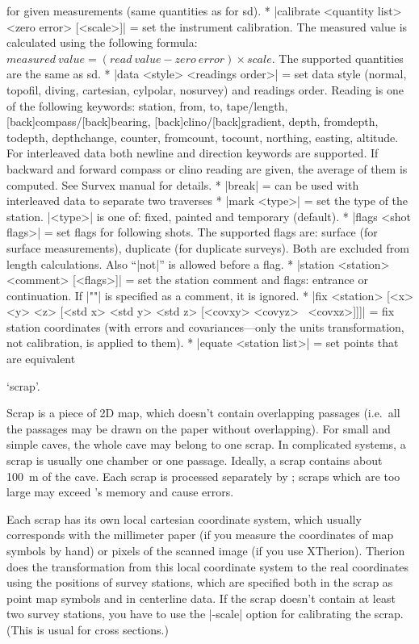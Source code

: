     for given measurements (same quantities as for sd).
  * |calibrate <quantity list> <zero error> [<scale>]| = set the
    instrument calibration. The measured value is calculated using the
    following formula:
    $measured\ value = (read\ value - zero\ error) \times scale$.
    The supported quantities are the same as sd.
  * |data <style> <readings order>| = set data style (normal, topofil,
    diving, cartesian, cylpolar, nosurvey) and readings order. Reading
    is one of the following keywords: station, from, to, tape/length, 
    [back]compass/[back]bearing, [back]clino/[back]gradient, 
    depth, fromdepth, todepth, depthchange, counter, 
    fromcount, tocount, northing, easting, altitude. 
    For interleaved data both newline and direction keywords
    are supported. If backward and forward compass or clino
    reading are given, the average of them is computed.
    See Survex manual for details.
  * |break| = can be used with interleaved data to separate two traverses
  * |mark <type>| = set the type of the station. |<type>| is one of: fixed, 
    painted and temporary (default).
  * |flags <shot flags>| = set flags for following shots. The supported
    flags are: surface (for surface measurements), duplicate (for
    duplicate surveys). Both are excluded from length calculations.
    Also ``|not|'' is allowed before a flag.
  * |station <station> <comment> [<flags>]| = set the station comment
    and flags: entrance or continuation. If |""| is specified as a
    comment, it is ignored.
  * |fix <station> [<x> <y> <z> [<std x> <std y> <std z> [<covxy> <covyz> \
<covxz>]]]| 
    = fix station coordinates (with errors and
    covariances---only the units transformation, not calibration,
    is applied to them).
  * |equate <station list>| = set points that are equivalent
\endcomopt





\subsubchapter `scrap'.

\description
  Scrap is a piece of 2D map, which doesn't contain overlapping passages
  (i.e.~all the passages may be drawn on the paper without overlapping).
  For small and simple caves, the whole cave may belong to one scrap. 
  In complicated systems, a scrap is usually one chamber or one passage. 
  Ideally, a scrap contains about 100~m of the cave. Each scrap is processed 
  separately by \MP; scraps which are too large may exceed \MP's memory and 
  cause errors.

  Each scrap has its own local cartesian coordinate system, which usually 
  corresponds with the millimeter paper (if you measure the coordinates of map
  symbols by hand) or pixels of the scanned image (if you use XTherion).
  Therion does the transformation from this local coordinate system to the 
  real coordinates using the positions of survey stations, which are 
  specified both in the scrap as point map symbols and in centerline data.
  If the scrap doesn't contain at least two survey stations, you have
  to use the |-scale| option for calibrating the scrap. (This is usual for
  cross sections.)
\enddescription

